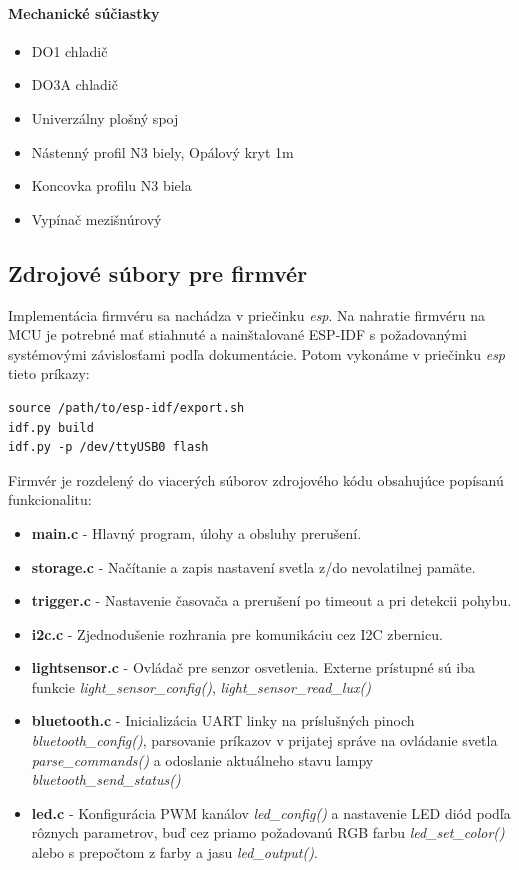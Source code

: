 \documentclass[12pt, a4paper]{article}
\begin{document}
\paragraph{Mechanické súčiastky}
\begin{itemize}
\itemsep0pt
\item DO1 chladič
\item DO3A chladič
\item Univerzálny plošný spoj
\item Nástenný profil N3 biely, Opálový kryt 1m
\item Koncovka profilu N3 biela
\item Vypínač mezišnúrový
\end{itemize}

\subsection{Zdrojové súbory pre firmvér}
Implementácia firmvéru sa nachádza v priečinku \emph{esp}. Na nahratie firmvéru na MCU je potrebné mať stiahnuté a nainštalované ESP-IDF s požadovanými systémovými závislosťami podľa dokumentácie. Potom vykonáme v priečinku \emph{esp} tieto príkazy:
\begin{verbatim}
source /path/to/esp-idf/export.sh
idf.py build
idf.py -p /dev/ttyUSB0 flash
\end{verbatim}

Firmvér je rozdelený do viacerých súborov zdrojového kódu obsahujúce popísanú funkcionalitu:
\begin{itemize}
\itemsep0pt
\item \textbf{main.c} - Hlavný program, úlohy a obsluhy prerušení.
\item \textbf{storage.c} - Načítanie a zapis nastavení svetla z/do nevolatilnej pamäte.
\item \textbf{trigger.c} - Nastavenie časovača a prerušení po timeout a pri detekcii pohybu.
\item \textbf{i2c.c} - Zjednodušenie rozhrania pre komunikáciu cez I2C zbernicu.
\item \textbf{lightsensor.c} - Ovládač pre senzor osvetlenia. Externe prístupné sú iba funkcie \emph{light\_sensor\_config()}, \emph{light\_sensor\_read\_lux()}
\item \textbf{bluetooth.c} - Inicializácia UART linky na príslušných pinoch \emph{bluetooth\_config()}, parsovanie príkazov v prijatej správe na ovládanie svetla \emph{parse\_commands()} a odoslanie aktuálneho stavu lampy \emph{bluetooth\_send\_status()}
\item \textbf{led.c} - Konfigurácia PWM kanálov \emph{led\_config()} a nastavenie LED diód podľa rôznych parametrov, buď cez priamo požadovanú RGB farbu \emph{led\_set\_color()} alebo s prepočtom z farby a jasu  \emph{led\_output()}.
\end{itemize}
\end{document}
